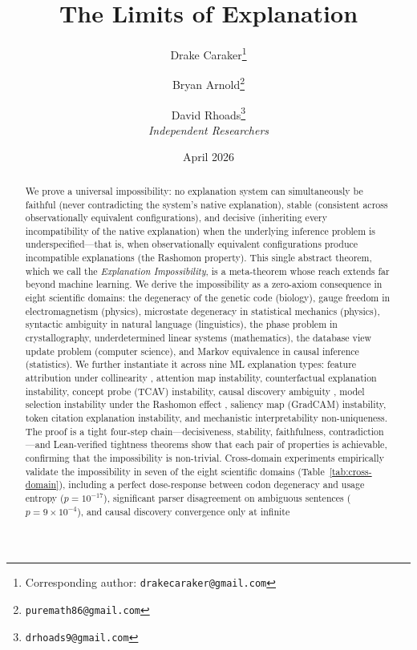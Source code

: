 \documentclass[11pt,a4paper]{article}
\title{The Limits of Explanation}
\author{%
  Drake Caraker\thanks{Corresponding author: \texttt{drakecaraker@gmail.com}}
  \and
  Bryan Arnold\thanks{\texttt{puremath86@gmail.com}}
  \and
  David Rhoads\thanks{\texttt{drhoads9@gmail.com}}
  \\[8pt]
  \textit{Independent Researchers}
}
\date{April 2026}
\begin{document}
\maketitle
\thispagestyle{empty}

\begin{abstract}
We prove a universal impossibility: no explanation system can simultaneously be
faithful (never contradicting the system's native explanation), stable
(consistent across observationally equivalent configurations), and decisive
(inheriting every incompatibility of the native explanation) when
the underlying inference problem is underspecified---that is, when
observationally equivalent configurations produce incompatible explanations
(the Rashomon property).
This single abstract theorem, which we call the \emph{Explanation
Impossibility}, is a meta-theorem whose reach extends far beyond machine
learning.  We derive the impossibility as a zero-axiom consequence in
eight scientific domains: the degeneracy of the genetic code (biology),
gauge freedom in electromagnetism (physics), microstate degeneracy in
statistical mechanics (physics), syntactic ambiguity in natural
language (linguistics), the phase problem in crystallography,
underdetermined linear systems (mathematics), the database view update
problem (computer science), and Markov equivalence in causal inference
(statistics).  We further instantiate it across nine ML explanation types:
feature attribution under collinearity
\citep{bilodeau2024impossibility}, attention map instability, counterfactual
explanation instability, concept probe (TCAV) instability, causal discovery
ambiguity \citep{verma1991equivalence}, model selection instability under the
Rashomon effect \citep{rudin2024amazing,fisher2019models}, saliency map
(GradCAM) instability, token citation explanation instability, and
mechanistic interpretability non-uniqueness.
The proof is a tight four-step chain---decisiveness, stability, faithfulness,
contradiction---and Lean-verified tightness theorems show that each pair of
properties is achievable, confirming that the impossibility is non-trivial.
Cross-domain experiments empirically validate the impossibility in seven of
the eight scientific domains (Table~\ref{tab:cross-domain}), including a
perfect dose-response between codon degeneracy and usage entropy
($p = 10^{-17}$), significant parser disagreement on ambiguous sentences
($p = 9 \times 10^{-4}$), and causal discovery convergence only at infinite

\end{abstract}
\end{document}
